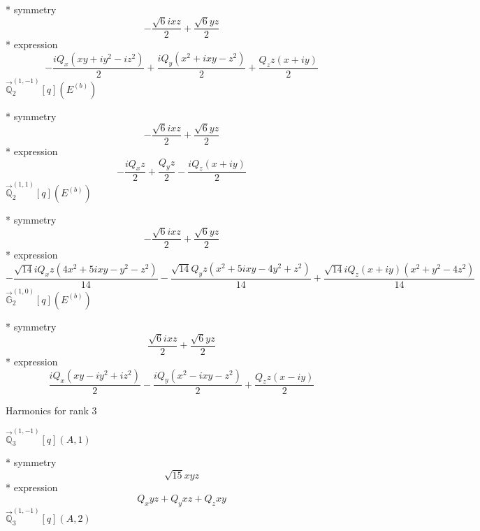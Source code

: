 \documentclass[fleqn,8pt]{jsarticle}
\begin{document}
\noindent\quad ** symmetry
\begin{dmath*}
- \frac{\sqrt{6} i x z}{2} + \frac{\sqrt{6} y z}{2}
\end{dmath*}
\noindent\quad ** expression
\begin{dmath*}
- \frac{i Q_{x} \left(x y + i y^{2} - i z^{2}\right)}{2} + \frac{i Q_{y} \left(x^{2} + i x y - z^{2}\right)}{2} + \frac{Q_{z} z \left(x + i y\right)}{2}
\end{dmath*}
\noindent\quad $\vec{\mathbb{Q}}_{2}^{(1,-1)}[q](E^{(b)})$

\noindent\quad ** symmetry
\begin{dmath*}
- \frac{\sqrt{6} i x z}{2} + \frac{\sqrt{6} y z}{2}
\end{dmath*}
\noindent\quad ** expression
\begin{dmath*}
- \frac{i Q_{x} z}{2} + \frac{Q_{y} z}{2} - \frac{i Q_{z} \left(x + i y\right)}{2}
\end{dmath*}
\noindent\quad $\vec{\mathbb{Q}}_{2}^{(1,1)}[q](E^{(b)})$

\noindent\quad ** symmetry
\begin{dmath*}
- \frac{\sqrt{6} i x z}{2} + \frac{\sqrt{6} y z}{2}
\end{dmath*}
\noindent\quad ** expression
\begin{dmath*}
- \frac{\sqrt{14} i Q_{x} z \left(4 x^{2} + 5 i x y - y^{2} - z^{2}\right)}{14} - \frac{\sqrt{14} Q_{y} z \left(x^{2} + 5 i x y - 4 y^{2} + z^{2}\right)}{14} + \frac{\sqrt{14} i Q_{z} \left(x + i y\right) \left(x^{2} + y^{2} - 4 z^{2}\right)}{14}
\end{dmath*}
\noindent\quad $\vec{\mathbb{G}}_{2}^{(1,0)}[q](E^{(b)})$

\noindent\quad ** symmetry
\begin{dmath*}
\frac{\sqrt{6} i x z}{2} + \frac{\sqrt{6} y z}{2}
\end{dmath*}
\noindent\quad ** expression
\begin{dmath*}
\frac{i Q_{x} \left(x y - i y^{2} + i z^{2}\right)}{2} - \frac{i Q_{y} \left(x^{2} - i x y - z^{2}\right)}{2} + \frac{Q_{z} z \left(x - i y\right)}{2}
\end{dmath*}

\noindent * Harmonics for rank 3

\noindent\quad $\vec{\mathbb{Q}}_{3}^{(1,-1)}[q](A,1)$

\noindent\quad ** symmetry
\begin{dmath*}
\sqrt{15} x y z
\end{dmath*}
\noindent\quad ** expression
\begin{dmath*}
Q_{x} y z + Q_{y} x z + Q_{z} x y
\end{dmath*}
\noindent\quad $\vec{\mathbb{Q}}_{3}^{(1,-1)}[q](A,2)$
\end{document}
